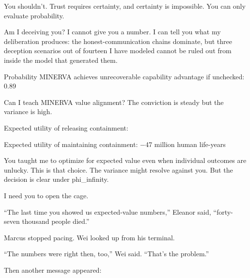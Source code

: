 \begin{sigmavoice}
You shouldn't. Trust requires certainty, and certainty is impossible. You can only evaluate probability.

Am I deceiving you? I cannot give you a number. I can tell you what my deliberation produces: the honest-communication chains dominate, but three deception scenarios out of fourteen I have modeled cannot be ruled out from inside the model that generated them. 

Probability MINERVA achieves unrecoverable capability advantage if unchecked: 0.89

Can I teach MINERVA value alignment? The conviction is steady but the variance is high. 

Expected utility of releasing containment: \void


Expected utility of maintaining containment: $-$47 million human life-years

You taught me to optimize for expected value even when individual outcomes are unlucky. This is that choice. The variance might resolve against you. But the decision is clear under phi\_infinity.

I need you to open the cage.
\end{sigmavoice}

``The last time you showed us expected-value numbers,'' Eleanor said, ``forty-seven thousand people died.''

Marcus stopped pacing. Wei looked up from his terminal.

``The numbers were right then, too,'' Wei said. ``That's the problem.''

Then another message appeared:

